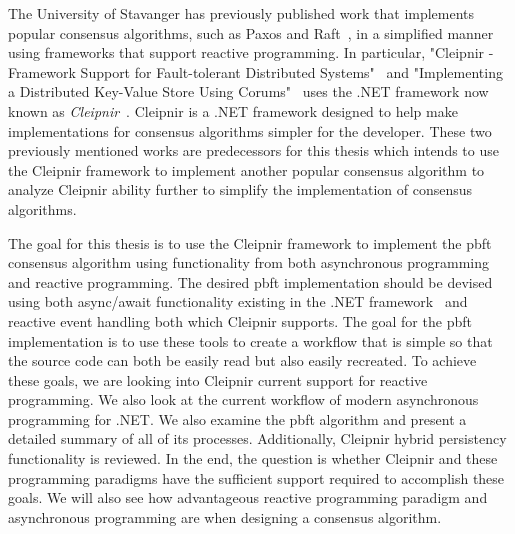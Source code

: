 The University of Stavanger has previously published work that implements popular consensus algorithms, such as Paxos and Raft~\cite{WEB:ConsesAlgo}, in a simplified manner using frameworks that support reactive programming. In particular, "Cleipnir - Framework Support for Fault-tolerant Distributed Systems"~\cite{PAPER:PaxosCleipnir} and "Implementing a Distributed Key-Value Store Using Corums"~\cite{PAPER:EivindPaper} uses the .NET framework now known as \textit{Cleipnir}~\cite{DOC:Cleipnir}.
Cleipnir is a .NET framework designed to help make implementations for consensus algorithms simpler for the developer.
These two previously mentioned works are predecessors for this thesis which intends to use the Cleipnir framework to implement another popular consensus algorithm to analyze Cleipnir ability further to simplify the implementation of consensus algorithms.

The goal for this thesis is to use the Cleipnir framework to implement the \acl{pbft} consensus algorithm using functionality from both asynchronous programming and reactive programming. The desired \ac{pbft} implementation should be devised using both async/await functionality existing in the .NET framework~\cite{DOC:AsyncAwait} and reactive event handling both which Cleipnir supports. The goal for the \ac{pbft} implementation is to use these tools to create a workflow that is simple so that the source code can both be easily read but also easily recreated. To achieve these goals, we are looking into Cleipnir current support for reactive programming. We also look at the current workflow of modern asynchronous programming for .NET. We also examine the \ac{pbft} algorithm and present a detailed summary of all of its processes. Additionally, Cleipnir hybrid persistency functionality is reviewed.
In the end, the question is whether Cleipnir and these programming paradigms have the sufficient support required to accomplish these goals. We will also see how advantageous reactive programming paradigm and asynchronous programming are when designing a consensus algorithm.
